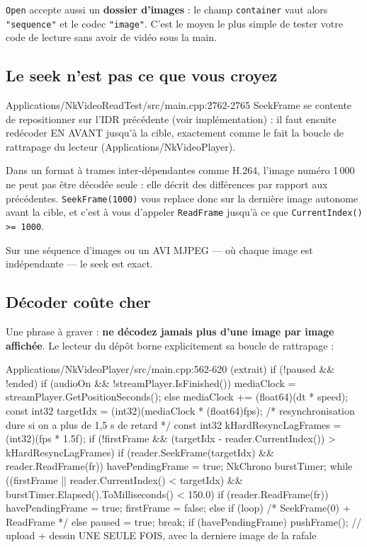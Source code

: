 \texttt{Open} accepte aussi un \textbf{dossier d'images} : le champ
\texttt{container} vaut alors \texttt{"sequence"} et le codec \texttt{"image"}.
C'est le moyen le plus simple de tester votre code de lecture sans avoir de
vidéo sous la main.

\subsection{Le seek n'est pas ce que vous croyez}

\begin{nkcode}{Applications/NkVideoReadTest/src/main.cpp:2762-2765}
 SeekFrame se contente de repositionner sur l'IDR précédente (voir implémentation) : il
 faut ensuite redécoder EN AVANT jusqu'à la cible, exactement comme le fait la boucle de
 rattrapage du lecteur (Applications/NkVideoPlayer).
\end{nkcode}

Dans un format à trames inter-dépendantes comme H.264, l'image numéro 1\,000 ne
peut pas être décodée seule : elle décrit des différences par rapport aux
précédentes. \texttt{SeekFrame(1000)} vous replace donc sur la dernière image
autonome avant la cible, et c'est à vous d'appeler \texttt{ReadFrame} jusqu'à ce
que \texttt{CurrentIndex() >= 1000}.

Sur une séquence d'images ou un AVI MJPEG — où chaque image est indépendante —
le seek est exact.

\subsection{Décoder coûte cher}

Une phrase à graver : \textbf{ne décodez jamais plus d'une image par image
affichée}. Le lecteur du dépôt borne explicitement sa boucle de rattrapage :

\begin{nkcode}{Applications/NkVideoPlayer/src/main.cpp:562-620 (extrait)}
        if (!paused && !ended) {
            if (audioOn && !streamPlayer.IsFinished())
                mediaClock = streamPlayer.GetPositionSeconds();
            else
                mediaClock += (float64)(dt * speed);
            const int32 targetIdx = (int32)(mediaClock * (float64)fps);
            /* resynchronisation dure si on a plus de 1,5 s de retard */
            const int32 kHardResyncLagFrames = (int32)(fps * 1.5f);
            if (!firstFrame && (targetIdx - reader.CurrentIndex()) > kHardResyncLagFrames) {
                if (reader.SeekFrame(targetIdx) && reader.ReadFrame(fr))
                    havePendingFrame = true;
            }
            NkChrono burstTimer;
            while ((firstFrame || reader.CurrentIndex() < targetIdx) &&
                   burstTimer.Elapsed().ToMilliseconds() < 150.0) {
                if (reader.ReadFrame(fr)) { havePendingFrame = true; firstFrame = false; }
                else if (loop) { /* SeekFrame(0) + ReadFrame */ }
                else { paused = true; break; }
            }
            if (havePendingFrame)
                pushFrame(); // upload + dessin UNE SEULE FOIS, avec la derniere image de la rafale
        }
\end{nkcode}

